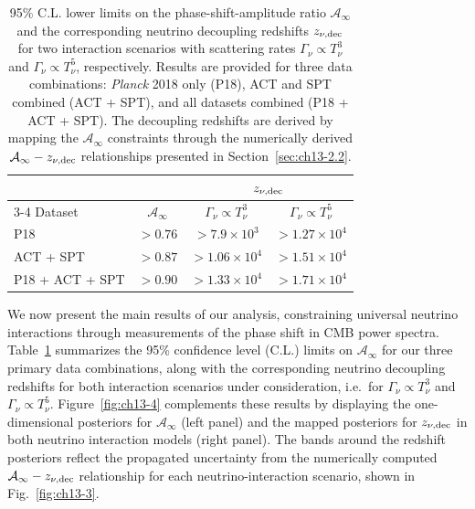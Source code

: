 \begin{table}
	\centering
	\begin{tabular}{l c @{\hskip 2em} c @{\hskip 1em} c}
			\toprule
			& & \multicolumn{2}{c}{$z_{\nu,\rm dec}$}\\
            \cmidrule(lr){3-4}
	Dataset & {$\mathcal{A}_\infty$} & {$\Gamma_\nu\propto T_\nu^3$} & {$\Gamma_\nu\propto T_\nu^5$} \\
            \midrule[0.065em]
	P18 & $>0.76$	& $> 7.9\times 10^3$	& $>1.27\times 10^4$	\\[4pt]
        ACT + SPT & $>0.87$	& $> 1.06\times 10^4$	& $>1.51\times 10^4$	\\[4pt]
        P18 + ACT + SPT & $>0.90$	& $> 1.33\times 10^4$	& $>1.71\times 10^4$ \\[2pt]
	\bottomrule
	\end{tabular}
	\caption[Constraints on phase shift and decoupling redshift]{95\% C.L. lower limits on the phase-shift-amplitude ratio $\mathcal{A}_\infty$ and the corresponding neutrino decoupling redshifts $z_{\nu,\rm dec}$ for two interaction scenarios with scattering rates $\Gamma_\nu \propto T_\nu^3$ and $\Gamma_\nu \propto T_\nu^5$, respectively. Results are provided for three data combinations: \textit{Planck} 2018 only (P18), ACT and SPT combined (ACT + SPT), and all datasets combined (P18 + ACT + SPT). The decoupling redshifts are derived by mapping the $\mathcal{A}_\infty$ constraints through the numerically derived $\mathcal{A}_\infty - z_{\nu,\rm dec}$ relationships presented in Section~\ref{sec:ch13-2.2}.}
	\label{tab:ch13-1}
\end{table}

\noindent We now present the main results of our analysis, constraining universal neutrino interactions through measurements of the phase shift in CMB power spectra. Table~\ref{tab:ch13-1} summarizes the 95\% confidence level (C.L.) limits on $\mathcal{A}_\infty$ for our three primary data combinations, along with the corresponding neutrino decoupling redshifts for both interaction scenarios under consideration, i.e.\ for $\Gamma_\nu\propto T_\nu^3$ and $\Gamma_\nu\propto T_\nu^5$. Figure~\ref{fig:ch13-4} complements these results by displaying the one-dimensional posteriors for $\mathcal{A}_\infty$ (left panel) and the mapped posteriors for $z_{\nu,\rm dec}$ in both neutrino interaction models (right panel). The bands around the redshift posteriors reflect the propagated uncertainty from the numerically computed $\mathcal{A}_\infty - z_{\nu,\rm dec}$ relationship for each neutrino-interaction scenario, shown in Fig.~\ref{fig:ch13-3}.

